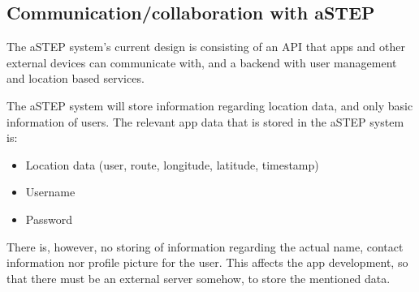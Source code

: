 \subsection{Communication/collaboration with aSTEP}
The aSTEP system's current design is consisting of an API that apps and other external devices can communicate with, and a backend with user management and location based services.



The aSTEP system will store information regarding location data, and only basic information of users. The relevant app data that is stored in the aSTEP system is:
\begin{itemize}
	\item Location data (user, route, longitude, latitude, timestamp)
	\item Username
	\item Password
\end{itemize}

There is, however, no storing of information regarding the actual name, contact information nor profile picture for the user. This affects the app development, so that there must be an external server somehow, to store the mentioned data. 




